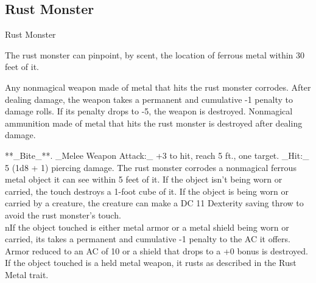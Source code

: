 \subsection{Rust Monster}
\begin{DndMonster}[float=*b,width\textwidth + 8pt]{Rust Monster}
\begin{multicols}{2}
\DndMonsterBasics[armor-class={14 (natural armor)}, hit-points={27 (5d8 + 5)}, speed={40 ft.}]
\DndMonsterDetails[saving-throws={}, skills={}, damage-immunities={}, damage-resistances={}, damage-vulnerabilities={}, condition-immunities={}, senses={darkvision 60 ft., passive Perception 11}, languages={—}, challenge={1/2 (100 XP)}]
 The rust monster can pinpoint, by scent, the location of ferrous metal within 30 feet of it.

 Any nonmagical weapon made of metal that hits the rust monster corrodes. After dealing damage, the weapon takes a permanent and cumulative -1 penalty to damage rolls. If its penalty drops to -5, the weapon is destroyed. Nonmagical ammunition made of metal that hits the rust monster is destroyed after dealing damage.

**_Bite_**. _Melee Weapon Attack:_ +3 to hit, reach 5 ft., one target. _Hit:_ 5 (1d8 + 1) piercing damage.
The rust monster corrodes a nonmagical ferrous metal object it can see within 5 feet of it. If the object isn’t being worn or carried, the touch destroys a 1-foot cube of it. If the object is being worn or carried by a creature, the creature can make a DC 11 Dexterity saving throw to avoid the rust monster’s touch.\\nIf the object touched is either metal armor or a metal shield being worn or carried, its takes a permanent and cumulative -1 penalty to the AC it offers. Armor reduced to an AC of 10 or a shield that drops to a +0 bonus is destroyed. If the object touched is a held metal weapon, it rusts as described in the Rust Metal trait.
\end{multicols}
\end{DndMonster}
